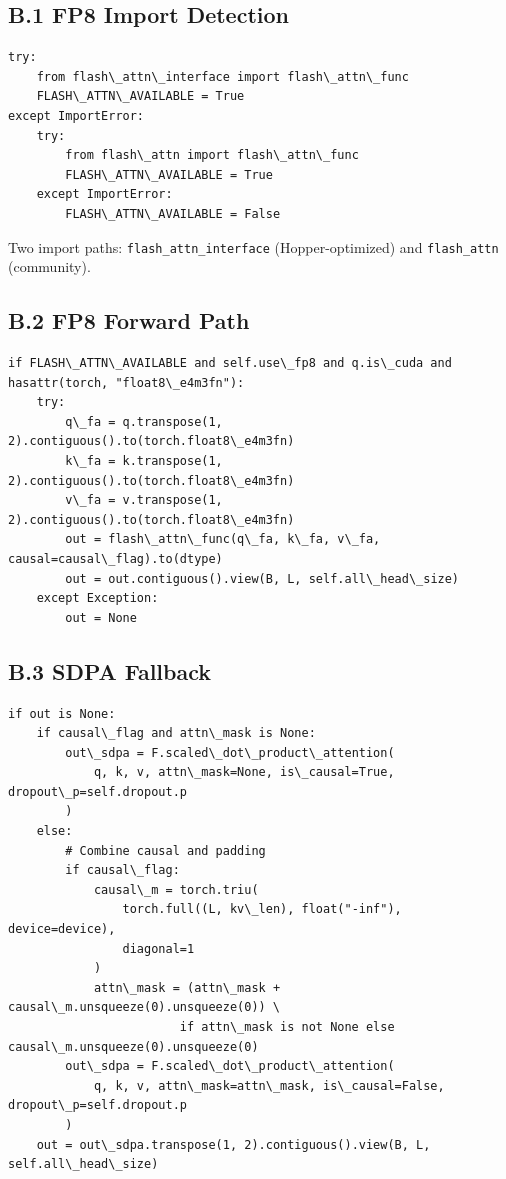 \subsection{B.1 FP8 Import Detection}

\begin{lstlisting}
try:
    from flash\_attn\_interface import flash\_attn\_func
    FLASH\_ATTN\_AVAILABLE = True
except ImportError:
    try:
        from flash\_attn import flash\_attn\_func
        FLASH\_ATTN\_AVAILABLE = True
    except ImportError:
        FLASH\_ATTN\_AVAILABLE = False
\end{lstlisting}

Two import paths: \texttt{flash\_attn\_interface} (Hopper-optimized) and \texttt{flash\_attn} 
(community).

\subsection{B.2 FP8 Forward Path}

\begin{lstlisting}
if FLASH\_ATTN\_AVAILABLE and self.use\_fp8 and q.is\_cuda and hasattr(torch, "float8\_e4m3fn"):
    try:
        q\_fa = q.transpose(1, 2).contiguous().to(torch.float8\_e4m3fn)
        k\_fa = k.transpose(1, 2).contiguous().to(torch.float8\_e4m3fn)
        v\_fa = v.transpose(1, 2).contiguous().to(torch.float8\_e4m3fn)
        out = flash\_attn\_func(q\_fa, k\_fa, v\_fa, causal=causal\_flag).to(dtype)
        out = out.contiguous().view(B, L, self.all\_head\_size)
    except Exception:
        out = None
\end{lstlisting}

\subsection{B.3 SDPA Fallback}

\begin{lstlisting}
if out is None:
    if causal\_flag and attn\_mask is None:
        out\_sdpa = F.scaled\_dot\_product\_attention(
            q, k, v, attn\_mask=None, is\_causal=True, dropout\_p=self.dropout.p
        )
    else:
        # Combine causal and padding
        if causal\_flag:
            causal\_m = torch.triu(
                torch.full((L, kv\_len), float("-inf"), device=device),
                diagonal=1
            )
            attn\_mask = (attn\_mask + causal\_m.unsqueeze(0).unsqueeze(0)) \
                        if attn\_mask is not None else causal\_m.unsqueeze(0).unsqueeze(0)
        out\_sdpa = F.scaled\_dot\_product\_attention(
            q, k, v, attn\_mask=attn\_mask, is\_causal=False, dropout\_p=self.dropout.p
        )
    out = out\_sdpa.transpose(1, 2).contiguous().view(B, L, self.all\_head\_size)
\end{lstlisting}

